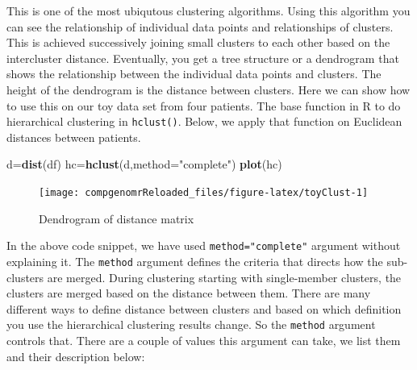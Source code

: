\documentclass[12pt,]{krantz}
\newenvironment{Shaded}{\begin{snugshade}}{\end{snugshade}}
\newcommand{\DataTypeTok}[1]{\textcolor[rgb]{0.13,0.29,0.53}{#1}}
\newcommand{\KeywordTok}[1]{\textcolor[rgb]{0.13,0.29,0.53}{\textbf{#1}}}
\newcommand{\NormalTok}[1]{#1}
\newcommand{\StringTok}[1]{\textcolor[rgb]{0.31,0.60,0.02}{#1}}
\begin{document}
This is one of the most ubiqutous clustering algorithms. Using this algorithm you can see the relationship of individual data points and relationships of clusters. This is achieved successively joining small clusters to each other based on the intercluster distance. Eventually, you get a tree structure or a dendrogram that shows the relationship between the individual data points and clusters. The height of the dendrogram is the distance between clusters. Here we can show how to use this on our toy data set from four patients. The base function in R to do hierarchical clustering in \texttt{hclust()}. Below, we apply that function on Euclidean distances between patients.

\begin{Shaded}
\begin{Highlighting}[]
\NormalTok{d=}\KeywordTok{dist}\NormalTok{(df)}
\NormalTok{hc=}\KeywordTok{hclust}\NormalTok{(d,}\DataTypeTok{method=}\StringTok{"complete"}\NormalTok{)}
\KeywordTok{plot}\NormalTok{(hc)}
\end{Highlighting}
\end{Shaded}

\begin{figure}

{\centering \texttt{[image: compgenomrReloaded\_files/figure-latex/toyClust-1]} 

}

\caption{Dendrogram of distance matrix}\label{fig:toyClust}
\end{figure}

In the above code snippet, we have used \texttt{method="complete"} argument without explaining it. The \texttt{method} argument defines the criteria that directs how the sub-clusters are merged. During clustering starting with single-member clusters, the clusters are merged based on the distance between them. There are many different ways to define distance between clusters and based on which definition you use the hierarchical clustering results change. So the \texttt{method} argument controls that. There are a couple of values this argument can take, we list them and their description below:
\end{document}
